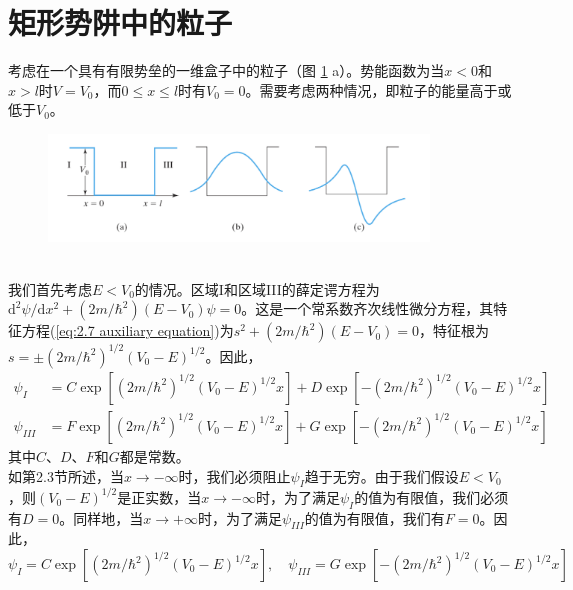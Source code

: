 \section{矩形势阱中的粒子}
	考虑在一个具有有限势垒的一维盒子中的粒子（图 \ref{fig:2.5} a）。势能函数为当$x<0$和$x>l$时$V=V_0$，而$0 \le x \le l$时有$V_0=0$。需要考虑两种情况，即粒子的能量高于或低于$V_0$。\\
	\begin{figure}[h!]
		\centering
		\includegraphics[width=0.9\textwidth]{Figures/2.5.png}  %
		\caption{}
		\label{fig:2.5}
	\end{figure}
	\\
	\indent 我们首先考虑$E < V_0$的情况。区域I和区域III的薛定谔方程为$\mathrm{d}^2\psi/\mathrm{d}x^2+\left(2m/\hbar^2\right)\left(E-V_0\right)\psi=0$。这是一个常系数齐次线性微分方程，其特征方程(\ref{eq:2.7 auxiliary equation})为$s^2+\left(2m/\hbar^2\right)\left(E-V_0\right)=0$，特征根为$s = \pm \left(2m/\hbar^2\right)^{1/2}\left(V_0-E\right)^{1/2}$。因此，
	\begin{equation*}
		\begin{aligned}
			\psi_I & = C \exp \left[\left(2m/\hbar^2\right)^{1/2}\left(V_0-E\right)^{1/2}x\right] + D \exp \left[-\left(2m/\hbar^2\right)^{1/2}\left(V_0-E\right)^{1/2}x\right] \\
			\psi_{III} & = F \exp \left[\left(2m/\hbar^2\right)^{1/2}\left(V_0-E\right)^{1/2}x\right] + G \exp \left[-\left(2m/\hbar^2\right)^{1/2}\left(V_0-E\right)^{1/2}x\right] 
		\end{aligned}
	\end{equation*}
	其中$C$、$D$、$F$和$G$都是常数。\\
	\indent 如第2.3节所述，当$x \to -\infty$时，我们必须阻止$\psi_I$趋于无穷。由于我们假设$E<V_0$，则$\left(V_0-E\right)^{1/2}$是正实数，当$x \to -\infty$时，为了满足$\psi_I$的值为有限值，我们必须有$D=0$。同样地，当$x \to +\infty$时，为了满足$\psi_{III}$的值为有限值，我们有$F=0$。因此，
	\begin{equation*}
		\psi_I  = C \exp \left[\left(2m/\hbar^2\right)^{1/2}\left(V_0-E\right)^{1/2}x\right] , \quad \psi_{III}  = G \exp \left[-\left(2m/\hbar^2\right)^{1/2}\left(V_0-E\right)^{1/2}x\right]
	\end{equation*}
